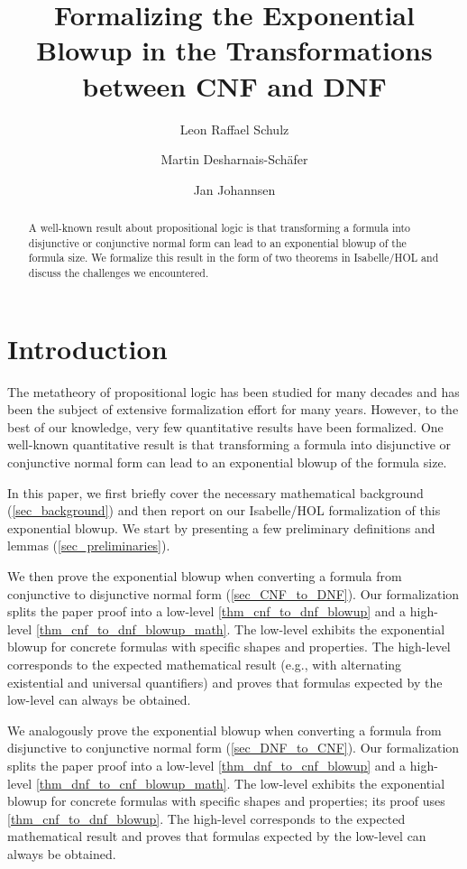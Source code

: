 \documentclass[a4paper,USenglish,cleveref, autoref, thm-restate]{lipics-v2021}
\title{Formalizing the Exponential Blowup in the Transformations between CNF and DNF}
\author{Leon Raffael Schulz}{\lmu{}, Germany}{Le.Schulz@campus.lmu.de}{https://orcid.org/0009-0007-7666-2034}{}
\author{Martin Desharnais-Schäfer}{\lmu{}, Germany}{desharnais-schaefer@ifi.lmu.de}{https://orcid.org/0000-0002-1830-7532}{
This research was co-funded by the European Union (ERC, Nekoka, 101083038). Views and opinions expressed are however those of the authors only and do not necessarily reflect those of the European Union or the European Research Council. Neither the European Union nor the granting authority can be held responsible for them.
}
\author{Jan Johannsen}{\lmu{}, Germany}{jan.johannsen@ifi.lmu.de}{https://orcid.org/0009-0004-2072-4679}{}
\theoremstyle{definition}
\begin{document}
\maketitle

\begin{abstract}
  A well-known result about propositional logic is that transforming a formula into disjunctive or conjunctive normal form can lead to an exponential blowup of the formula size.
  We formalize this result in the form of two theorems in Isabelle/HOL and discuss the challenges we encountered.
\end{abstract}

\section{Introduction}
\label{sec_intro}

The metatheory of propositional logic has been studied for many decades and has been the subject of extensive formalization effort for many years.
However, to the best of our knowledge, very few quantitative results have been formalized.
One well-known quantitative result is that transforming a formula into disjunctive or conjunctive normal form can lead to an exponential blowup of the formula size.

In this paper, we first briefly cover the necessary mathematical background (\cref{sec_background}) and then report on our Isabelle/HOL formalization of this exponential blowup.
We start by presenting a few preliminary definitions and lemmas (\cref{sec_preliminaries}).

We then prove the exponential blowup when converting a formula from conjunctive to disjunctive normal form (\cref{sec_CNF_to_DNF}).
Our formalization splits the paper proof into a low-level \cref{thm_cnf_to_dnf_blowup} and a high-level \cref{thm_cnf_to_dnf_blowup_math}.
The low-level  exhibits the exponential blowup for concrete formulas with specific shapes and properties.
The high-level  corresponds to the expected mathematical result (e.g., with alternating existential and universal quantifiers) and proves that formulas expected by the low-level  can always be obtained.

We analogously prove the exponential blowup when converting a formula from disjunctive to conjunctive normal form (\cref{sec_DNF_to_CNF}).
Our formalization splits the paper proof into a low-level \cref{thm_dnf_to_cnf_blowup} and a high-level \cref{thm_dnf_to_cnf_blowup_math}.
The low-level  exhibits the exponential blowup for concrete formulas with specific shapes and properties;
its proof uses \cref{thm_cnf_to_dnf_blowup}.
The high-level  corresponds to the expected mathematical result and proves that formulas expected by the low-level  can always be obtained.
\end{document}

